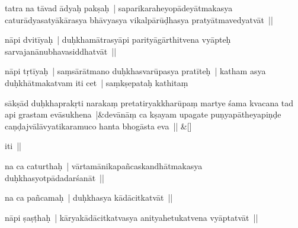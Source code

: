 \documentclass[article,12pt,a4paper]{memoir}%
\newcounter{parCount}
\begin{document}
	  
	  \pstart \leavevmode%
	\label{thakur75-2.7}tatra na tāvad ādyaḥ pakṣaḥ | saparikaraheyopādeyātmakasya caturādyasatyākārasya bhāvyasya vikalpārūḍhasya pratyātmavedyatvāt || 
	{}
	\pend%
      

	  
	  \pstart \leavevmode%
	\label{thakur75-2.9} nāpi dvitīyaḥ | duḥkhamātrasyāpi parityāgārthitvena vyāpteḥ sarvajanānubhavasiddhatvāt ||
	{}
	\pend%
      

	  
	  \pstart \leavevmode%
	\label{thakur75-2.11}nāpi tṛtīyaḥ | saṃsārātmano duḥkhasvarūpasya pratīteḥ | katham asya duḥkhātmakatvam iti cet | saṃkṣepataḥ kathitaṃ 
	{}
	\pend%
      
	    
	    \stanza[\smallbreak]
	  sākṣād duḥkhaprakṛti narakaṃ pretatiryakkharūpaṃ martye śama kvacana tad api grastam evāsukhena |&devānāṃ ca kṣayam upagate puṇyapātheyapiṇḍe caṇḍajvālāvyatikaramuco hanta bhogāsta eva || \&[\smallbreak]
	  
	  
	  

	  
	  \pstart \leavevmode%
	iti || 
	{}
	\pend%
      

	  
	  \pstart \leavevmode%
	\label{thakur75-2.17}na ca caturthaḥ | vārtamānikapañcaskandhātmakasya duḥkhasyotpādadarśanāt || 
	{}
	\pend%
      

	  
	  \pstart \leavevmode%
	\label{thakur75-2.18}na ca pañcamaḥ | duḥkhasya kādācitkatvāt || 
	{}
	\pend%
      

	  
	  \pstart \leavevmode%
	\label{thakur75-2.19}nāpi ṣaṣṭhaḥ | kāryakādācitkatvasya anityahetukatvena vyāptatvāt || 
	{}
	\pend%
      
\end{document}
